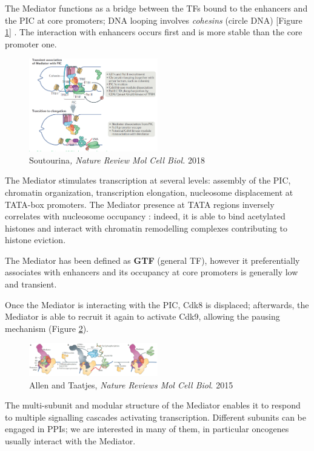 The Mediator functions as a bridge between the TFs bound to the enhancers and the PIC at core promoters; DNA looping involves \emph{cohesins} (circle DNA) [Figure \ref{fig:cohesin}] . The interaction with enhancers occurs first and is more stable than the core promoter one.

\begin{figure}
\centering
\includegraphics[width=0.5\textwidth]{../_resources/Screenshot_2022-10-07_at_10-54-13.png}
\caption{Soutourina\emph{, Nature Review Mol Cell Biol.} 2018}
\label{fig:cohesin}
\end{figure}

The Mediator stimulates transcription at several levels: assembly of the PIC, chromatin organization, transcription elongation, nucleosome displacement at TATA-box promoters. The Mediator presence at TATA regions inversely correlates with nucleosome occupancy : indeed, it is able to bind acetylated histones and interact with chromatin remodelling complexes contributing to histone eviction.

The Mediator has been defined as \textbf{GTF} (general TF), however it preferentially associates with enhancers and its occupancy at core promoters is generally low and transient.

Once the Mediator is interacting with the PIC, Cdk8 is displaced; afterwards, the Mediator is able to recruit it again to activate Cdk9, allowing the pausing mechanism (Figure \ref{fig:cdk9}).

\begin{figure}
\centering
\includegraphics[width=0.5\textwidth]{../_resources/Screenshot_2022-10-10_at_11-03-13.png}
\caption{Allen and Taatjes, \emph{Nature Reviews Mol Cell Biol}. 2015}
\label{fig:cdk9}
\end{figure}

The multi-subunit and modular structure of the Mediator enables it to respond to multiple signalling cascades activating transcription. Different subunits can be engaged in PPIs; we are interested in many of them, in particular oncogenes usually interact with the Mediator.

